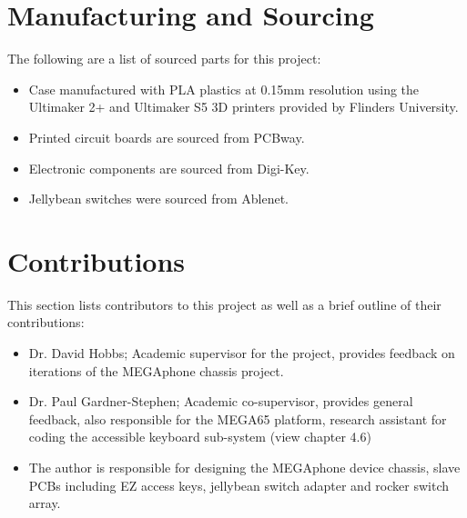 
\section{Manufacturing and Sourcing}

The following are a list of sourced parts for this project:

\begin{itemize} 
    \item Case manufactured with PLA plastics at 0.15mm resolution using the Ultimaker 2+ and Ultimaker S5 3D printers provided by Flinders University.
    \item Printed circuit boards are sourced from PCBway.
    \item Electronic components are sourced from Digi-Key.
    \item Jellybean switches were sourced from Ablenet.
    \end{itemize}


\section{Contributions}

This section lists contributors to this project as well as a brief outline of their contributions:

\begin{itemize} 
    \item Dr. David Hobbs; Academic supervisor for the project, provides feedback on iterations of the MEGAphone chassis project.
    \item Dr. Paul Gardner-Stephen; Academic co-supervisor, provides general feedback, also responsible for the MEGA65 platform, research assistant for coding the accessible keyboard sub-system (view chapter 4.6)
    \item The author is responsible for designing the MEGAphone device chassis, slave PCBs including EZ access keys, jellybean switch adapter and rocker switch array.
    \end{itemize}